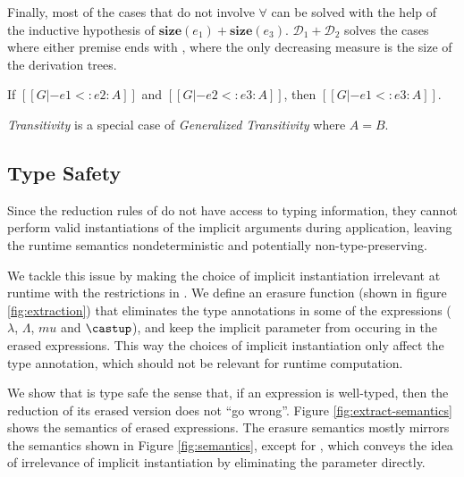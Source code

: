 Finally, most of the cases that do not involve $\forall$ can be
solved with the help of the inductive hypothesis of
$\mathbf{size}(e_1) + \mathbf{size}(e_3)$. $\mathcal{D}_1 + \mathcal{D}_2$ solves
the cases where either premise ends with , where the only decreasing
measure is the size of the derivation trees.

\begin{corollary}[Transitivity]
    If $[[G |- e1 <: e2 : A]]$ and $[[G |- e2 <: e3 : A]]$,
    then $[[G |- e1 <: e3 : A]]$.
\end{corollary}

\emph{Transitivity} is a special case of
\emph{Generalized Transitivity} where $A = B$.

\subsection{Type Safety}
\label{sec:type-safety}

Since the reduction rules of \name do not have access to typing information, they
cannot perform valid instantiations of the implicit arguments during application,
leaving the runtime semantics nondeterministic and potentially non-type-preserving.

We tackle this issue by making the choice of implicit instantiation
irrelevant at runtime with the restrictions in .
We define an erasure function (shown in figure \ref{fig:extraction})
that eliminates the type annotations
in some of the expressions ($\lambda$, $\Lambda$, $mu$ and $\castup$),
and keep the implicit parameter from occuring in the erased expressions.
This way the choices of implicit instantiation only affect the type annotation,
which should not be relevant for runtime computation.

We show that \name is type safe the sense that,
if an expression is well-typed, then the reduction of its erased version
does not ``go wrong''. Figure \ref{fig:extract-semantics} shows the semantics of
erased expressions. The erasure semantics mostly mirrors the semantics
shown in Figure \ref{fig:semantics}, except for , which
conveys the idea of irrelevance of implicit instantiation by eliminating the
parameter directly.

